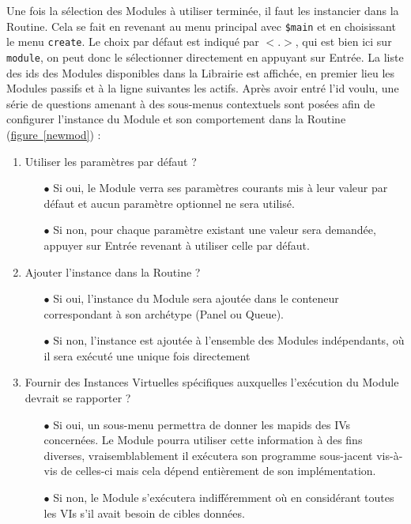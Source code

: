 \documentclass[]{article}
\newcommand{\wordlink}[2]{\hyperref[#1]{#2~\ref{#1}}}
\begin{document}
\par Une fois la sélection des Modules à utiliser terminée, il faut les instancier dans la Routine. Cela se fait en revenant au menu principal avec \texttt{\$main} et en choisissant le menu \texttt{create}. Le choix par défaut est indiqué par \texttt{$< . >$}, qui est bien ici sur \texttt{module}, on peut donc le sélectionner directement en appuyant sur Entrée. La liste des ids des Modules disponibles dans la Librairie est affichée, en premier lieu les Modules passifs et à la ligne suivantes les actifs. Après avoir entré l'id voulu, une série de questions amenant à des sous-menus contextuels sont posées afin de configurer l'instance du Module et son comportement dans la Routine (\wordlink{newmod}{figure}) :\\
\begin{enumerate}
\item Utiliser les paramètres par défaut ?
	\begin{itemize}
	\item[$\bullet$] Si oui, le Module verra ses paramètres courants mis à leur valeur par défaut et aucun paramètre optionnel ne sera utilisé.
	\item[$\bullet$] Si non, pour chaque paramètre existant une valeur sera demandée, appuyer sur Entrée revenant à utiliser celle par défaut.
	\end{itemize}  
\vspace{0.2cm}
\item Ajouter l'instance dans la Routine ?
	\begin{itemize}
	\item[$\bullet$] Si oui, l'instance du Module sera ajoutée dans le conteneur correspondant à son archétype (Panel ou Queue).
	\item[$\bullet$] Si non, l'instance est ajoutée à l'ensemble des Modules indépendants, où il sera exécuté une unique fois directement
	\end{itemize}
\vspace{0.2cm}
\item Fournir des Instances Virtuelles spécifiques auxquelles l'exécution du Module devrait se rapporter ?
	\begin{itemize}
	\item[$\bullet$] Si oui, un sous-menu permettra de donner les mapids des IVs concernées. Le Module pourra utiliser cette information à des fins diverses, vraisemblablement il exécutera son programme sous-jacent vis-à-vis de celles-ci mais cela dépend entièrement de son implémentation.
	\item[$\bullet$] Si non, le Module s'exécutera indifféremment où en considérant toutes les VIs s'il avait besoin de cibles données.

\end{itemize}
\end{enumerate}
\end{document}
